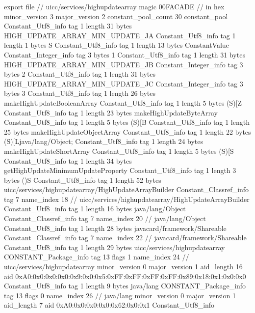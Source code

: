 export file {		// uicc/services/highupdatearray
	magic	00FACADE		 // in hex
	minor_version	3
	major_version	2
	constant_pool_count	30
	constant_pool {
		Constant_Utf8_info {
			tag	1
			length	31
			bytes	HIGH_UPDATE_ARRAY_MIN_UPDATE_JA
		}
		Constant_Utf8_info {
			tag	1
			length	1
			bytes	S
		}
		Constant_Utf8_info {
			tag	1
			length	13
			bytes	ConstantValue
		}
		Constant_Integer_info {
			tag	3
			bytes	1
		}
		Constant_Utf8_info {
			tag	1
			length	31
			bytes	HIGH_UPDATE_ARRAY_MIN_UPDATE_JB
		}
		Constant_Integer_info {
			tag	3
			bytes	2
		}
		Constant_Utf8_info {
			tag	1
			length	31
			bytes	HIGH_UPDATE_ARRAY_MIN_UPDATE_JC
		}
		Constant_Integer_info {
			tag	3
			bytes	3
		}
		Constant_Utf8_info {
			tag	1
			length	26
			bytes	makeHighUpdateBooleanArray
		}
		Constant_Utf8_info {
			tag	1
			length	5
			bytes	(S)[Z
		}
		Constant_Utf8_info {
			tag	1
			length	23
			bytes	makeHighUpdateByteArray
		}
		Constant_Utf8_info {
			tag	1
			length	5
			bytes	(S)[B
		}
		Constant_Utf8_info {
			tag	1
			length	25
			bytes	makeHighUpdateObjectArray
		}
		Constant_Utf8_info {
			tag	1
			length	22
			bytes	(S)[Ljava/lang/Object;
		}
		Constant_Utf8_info {
			tag	1
			length	24
			bytes	makeHighUpdateShortArray
		}
		Constant_Utf8_info {
			tag	1
			length	5
			bytes	(S)[S
		}
		Constant_Utf8_info {
			tag	1
			length	34
			bytes	getHighUpdateMinimumUpdateProperty
		}
		Constant_Utf8_info {
			tag	1
			length	3
			bytes	()S
		}
		Constant_Utf8_info {
			tag	1
			length	52
			bytes	uicc/services/highupdatearray/HighUpdateArrayBuilder
		}
		Constant_Classref_info {
			tag	7
			name_index	18		// uicc/services/highupdatearray/HighUpdateArrayBuilder
		}
		Constant_Utf8_info {
			tag	1
			length	16
			bytes	java/lang/Object
		}
		Constant_Classref_info {
			tag	7
			name_index	20		// java/lang/Object
		}
		Constant_Utf8_info {
			tag	1
			length	28
			bytes	javacard/framework/Shareable
		}
		Constant_Classref_info {
			tag	7
			name_index	22		// javacard/framework/Shareable
		}
		Constant_Utf8_info {
			tag	1
			length	29
			bytes	uicc/services/highupdatearray
		}
		CONSTANT_Package_info {
			tag	13
			flags	1
			name_index	24		// uicc/services/highupdatearray
			minor_version	0
			major_version	1
			aid_length	16
			aid	0xA0:0x0:0x0:0x0:0x9:0x0:0x5:0xFF:0xFF:0xFF:0xFF:0x89:0x18:0x1:0x0:0x0
		}
		Constant_Utf8_info {
			tag	1
			length	9
			bytes	java/lang
		}
		CONSTANT_Package_info {
			tag	13
			flags	0
			name_index	26		// java/lang
			minor_version	0
			major_version	1
			aid_length	7
			aid	0xA0:0x0:0x0:0x0:0x62:0x0:0x1
		}
		Constant_Utf8_info {
}}}
